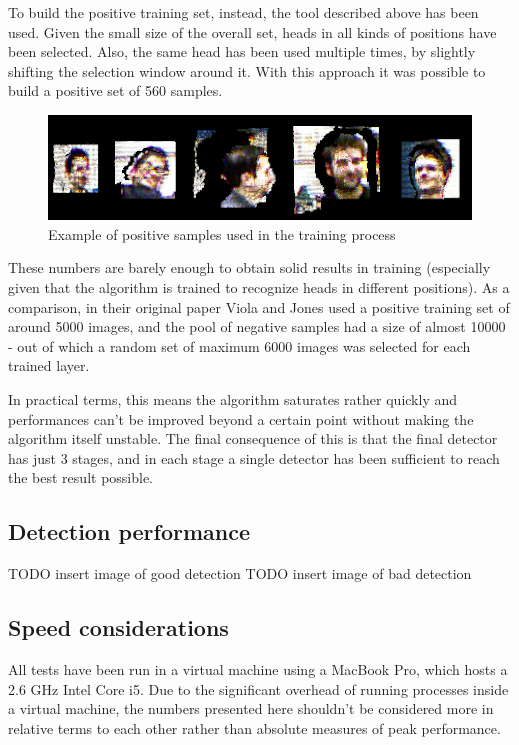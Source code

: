 \documentclass[a4paper,11pt,titlepage]{article}
\begin{document}
To build the positive training set, instead, the tool described above has been
used. Given the small size of the overall set, heads in all kinds of positions
have been selected. Also, the same head has been used multiple times, by
slightly shifting the selection window around it. With this approach it was
possible to build a positive set of 560 samples.

\begin{figure}[h]
  \centering
  \includegraphics[scale=0.8]{positive_samples.jpg}
  \caption{Example of positive samples used in the training process}
  \label{fig:positive_samples}
\end{figure}

These numbers are barely enough to obtain solid results in training (especially
given that the algorithm is trained to recognize heads in different positions).
As a comparison, in their original paper Viola and Jones used a positive
training set of around 5000 images, and the pool of negative samples had a size
of almost 10000 - out of which a random set of maximum 6000 images was selected
for each trained layer.

In practical terms, this means the algorithm saturates rather quickly and
performances can't be improved beyond a certain point without making the
algorithm itself unstable. The final consequence of this is that the final
detector has just 3 stages, and in each stage a single detector has been
sufficient to reach the best result possible.

\subsection{Detection performance}

TODO insert image of good detection
TODO insert image of bad detection

\subsection{Speed considerations}
All tests have been run in a virtual machine using a MacBook Pro, which hosts a
2.6 GHz Intel Core i5. Due to the significant overhead of running processes
inside a virtual machine, the numbers presented here shouldn't be considered
more in relative terms to each other rather than absolute measures of peak
performance.
\end{document}

